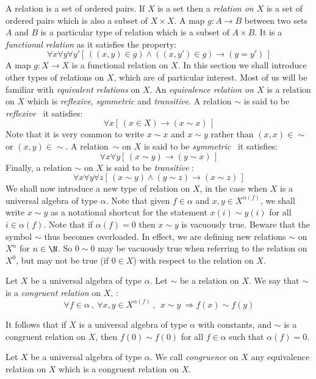 A relation is a set of ordered pairs. If $X$ is a set then a {\em
relation on $X$} is a set of ordered pairs which is also a subset of
$X\times X$. A map $g:A\to B$ between two sets $A$ and $B$ is a
particular type of relation which is a subset of $A\times B$. It is
a {\em functional relation} as it satisfies the property:
    \[
    \forall x\forall y\forall y'[\,((x,y)\in g)\land((x,y')\in g)\to(y=y')\,]
    \]
A map $g:X\to X$ is a functional relation on $X$. In this section we
shall introduce other types of relations on $X$, which are of
particular interest. Most of us will be familiar with {\em
equivalent relations} on $X$. An {\em equivalence relation on $X$}
is a relation on $X$ which is {\em reflexive}, {\em symmetric} and
{\em transitive}. A relation $\sim$ is said to be {\em reflexive}
\ifand\ it satisfies:
    \[
    \forall x[\,(x\in X)\to (x\sim x)\,]
    \]
Note that it is very common to write $x\sim x$ and $x\sim y$ rather
than $(x,x)\in\sim$ or $(x,y)\in\sim$. A relation~$\sim$ on $X$ is
said to be {\em symmetric} \ifand\ it satisfies:
    \[
    \forall x\forall y[\,(x\sim y)\to(y\sim x)\,]
    \]
Finally, a relation $\sim$ on $X$ is said to be {\em transitive} \ifand:
    \[
    \forall x\forall y\forall z[\, (x\sim y)\land(y\sim z)\to(x\sim z)\,]
    \]
We shall now introduce a new type of relation on $X$, in the case
when $X$ is a universal algebra of type $\alpha$. Note that given
$f\in\alpha$ and $x,y\in X^{\alpha(f)}$, we shall write $x\sim y$ as
a notational shortcut for the statement $x(i)\sim y(i)$ for all
$i\in\alpha(f)$. Note that if $\alpha(f)=0$ then $x\sim y$ is
vacuously true. Beware that the symbol $\sim$ thus becomes
overloaded. In effect, we are defining new relations $\sim$ on
$X^{n}$ for $n\in\N$. So $0\sim 0$ may be vacuously true when
referring to the relation on $X^{0}$, but may not be true (if $0\in
X$) with respect to the relation on $X$.
\begin{defin}\label{logic:def:congruent:relation}
Let $X$ be a universal algebra of type $\alpha$. Let $\sim$ be a
relation on $X$. We say that $\sim$ is a {\em congruent relation} on
$X$, \ifand:
    \[
    \forall f\in\alpha\ ,\ \forall x,y\in X^{\alpha(f)}\ ,\ \ x\sim y\ \Rightarrow f(x)\sim f(y)
    \]
\end{defin}
It follows that if $X$ is a universal algebra of type $\alpha$ with
constants, and $\sim$ is a congruent relation on $X$, then $f(0)\sim
f(0)$ for all $f\in\alpha$ such that $\alpha(f)=0$.
\begin{defin}\label{logic:def:congruence}
Let $X$ be a universal algebra of type $\alpha$. We call {\em
congruence} on $X$ any equivalence relation on $X$ which is a
congruent relation on $X$.
\end{defin}

